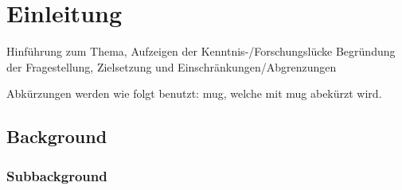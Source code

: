 \section{Einleitung}
\label{einleitung}

Hinführung zum Thema, Aufzeigen der Kenntnis-/Forschungslücke Begründung der Fragestellung, Zielsetzung und
Einschränkungen/Abgrenzungen

Abkürzungen werden wie folgt benutzt: \acrlong{mug}, welche mit \acrshort{mug} abekürzt wird.

\clearpage


\lipsum[1]

\subsection{Background}
\lipsum[1] \cite{key1}

\subsubsection{Subbackground}